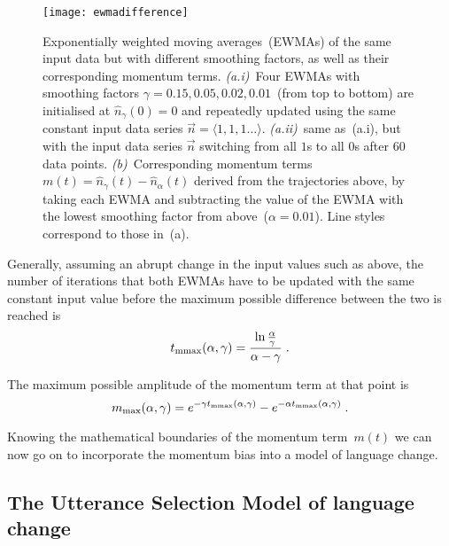 \begin{figure}
\centering
\texttt{[image: ewmadifference]}
\caption[Exponentially weighted moving averages~(EWMAs) of the same input data but with different smoothing factors, as well as their corresponding momentum terms]{Exponentially weighted moving averages~(EWMAs) of the same input data but with different smoothing factors, as well as their corresponding momentum terms.
\textit{(a.i)}~Four EWMAs with smoothing factors $\gamma=0.15, 0.05, 0.02, 0.01$~(from top to bottom) are initialised at $\hat{n}_\gamma(0)=0$ and repeatedly updated using the same constant input data series $\vec{n}=\langle1,1,1\dots\rangle$. \textit{(a.ii)}~same as~(a.i), but with the input data series $\vec{n}$ switching from all $1$s to all $0$s after 60 data points. %
\textit{(b)}~Corresponding momentum terms~$m(t)=\hat{n}_\gamma(t)-\hat{n}_\alpha(t)$ derived from the trajectories above, by taking each EWMA and subtracting the value of the EWMA with the lowest smoothing factor from above~($\alpha=0.01$). Line styles correspond to those in~(a).}
\label{fig:ewmadifference}
\end{figure}

Generally, assuming an abrupt change in the input values such as above, the number of iterations that both EWMAs have to be updated with the same constant input value before the maximum possible difference between the two is reached is
\begin{equation}
t_{\rm mmax}(\alpha,\gamma)=\frac{\ln\frac{\alpha}{\gamma}}{\alpha-\gamma}\;.
\end{equation}

The maximum possible amplitude of the momentum term at that point is
\begin{equation}
m_{\rm max}(\alpha, \gamma)=e^{-\gamma t_{\rm mmax}(\alpha,\gamma)}-e^{-\alpha t_{\rm mmax}(\alpha,\gamma)}\;.
\end{equation}

Knowing the mathematical boundaries of the momentum term~$m(t)$ we can now go on to incorporate the momentum bias into a model of language change.

\subsection{The Utterance Selection Model of language change}


